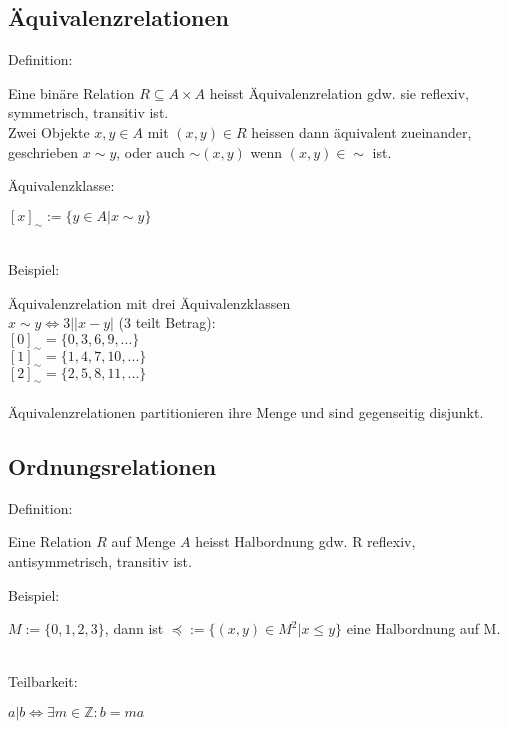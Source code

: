 \documentclass[8pt,landscape]{scrartcl}
\begin{document}
\begin{multicols}{3}
\subsection{\"Aquivalenzrelationen}
\begin{bf}Definition:\end{bf} Eine bin\"are Relation $R \subseteq A \times A $ heisst \"Aquivalenzrelation gdw. sie reflexiv, symmetrisch, transitiv ist.\\
Zwei Objekte $x, y \in A$ mit $(x, y) \in R$ heissen dann \"aquivalent zueinander, geschrieben $x \sim y$, oder auch $\sim (x, y)$ wenn $(x, y) \in \sim$ ist.\\
\begin{bf}\"Aquivalenzklasse:\end{bf} $\left[x\right]_{\sim} := \{ y \in A | x \sim y \}$\\\\ 
\begin{bf}Beispiel:\end{bf} \"Aquivalenzrelation mit drei \"Aquivalenzklassen\\
$x \sim y \iff 3| \left| x - y \right|$ (3 teilt Betrag):\\
$\left[0\right]_{\sim} = \{ 0, 3, 6, 9, ...\}$\\
$\left[1\right]_{\sim} = \{ 1, 4, 7, 10, ...\}$\\
$\left[2\right]_{\sim} = \{ 2, 5, 8, 11, ...\}$\\\\
\"Aquivalenzrelationen partitionieren ihre Menge und sind gegenseitig disjunkt.

\subsection{Ordnungsrelationen}
\begin{bf}Definition:\end{bf} Eine Relation $R$ auf Menge $A$ heisst Halbordnung gdw. R reflexiv, antisymmetrisch, transitiv ist.\\
\begin{bf}Beispiel:\end{bf} $M := \{0, 1, 2, 3\}$, dann ist $\preceq := \{ (x, y) \in M^2 | x \leq y \}$ eine Halbordnung auf M.\\\\
\begin{bf}Teilbarkeit:\end{bf} $a|b \iff \exists m \in \mathbb{Z} : b = ma$


\end{multicols}
\end{document}

